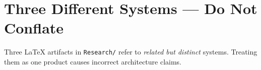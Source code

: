\documentclass[12pt,a4paper]{article}
\begin{document}
\tableofcontents
\newpage

\begin{abstract}
\noindent
This document describes \textbf{our agent}---the WN\_GPT healthcare backend at \texttt{Backend/}---not the commercial \textbf{WellnessGPT} platform documented in \texttt{wellnessgpt\_tse.tex} (HeyDoc AI). Our implementation is a \textbf{15-agent}, \textbf{LangGraph} system with \textbf{Azure OpenAI}, \textbf{SQLite}, and a \textbf{supervisor router} (\texttt{detect\_intent}), not HeyDoc's advertised \textbf{Agentic Orchestration Engine} or \textbf{HealthMem} stack. We state the problem, document the real process flow, contrast our agent with \textbf{Hippocratic AI} and \textbf{August AI}, and specify \textbf{page-indexed grounding} as our planned anti-hallucination layer.
\end{abstract}

\newpage

\section{Three Different Systems --- Do Not Conflate}

Three LaTeX artifacts in \texttt{Research/} refer to \emph{related but distinct} systems. Treating them as one product causes incorrect architecture claims.
\end{document}
